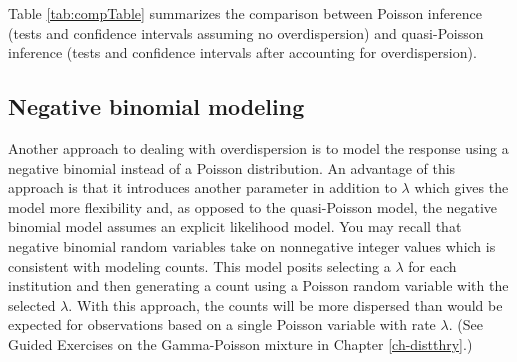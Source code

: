 \documentclass[
]{krantz}
\begin{document}
Table \ref{tab:compTable} summarizes the comparison between Poisson inference (tests and confidence intervals assuming no overdispersion) and quasi-Poisson inference (tests and confidence intervals after accounting for overdispersion).

\begin{table}

\caption{\label{tab:compTable}Comparison of Poisson and quasi-Poisson inference}
\centering
{}
\end{table}

\hypertarget{negative-binomial-modeling}{%
\subsection{Negative binomial modeling}\label{negative-binomial-modeling}}

Another approach to dealing with overdispersion is to model the response using a negative binomial instead of a Poisson distribution. An advantage of this approach is that it introduces another parameter in addition to \(\lambda\) which gives the model more flexibility and, as opposed to the quasi-Poisson model, the negative binomial model assumes an explicit likelihood model. You may recall that negative binomial random variables take on nonnegative integer values which is consistent with modeling counts. This model posits selecting a \(\lambda\) for each institution and then generating a count using a Poisson random variable with the selected \(\lambda\). With this approach, the counts will be more dispersed than would be expected for observations based on a single Poisson variable with rate \(\lambda\). (See Guided Exercises on the Gamma-Poisson mixture in Chapter \ref{ch-distthry}.)
\end{document}

